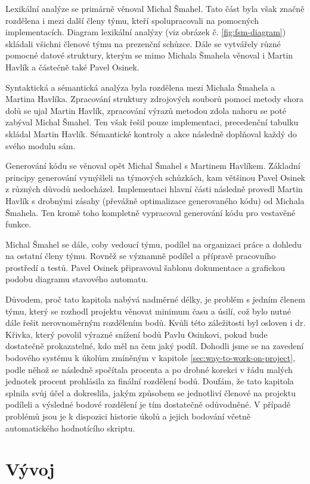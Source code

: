 \documentclass[11pt,a4paper]{article}
\begin{document}
Lexikální analýze se primárně věnoval Michal Šmahel. Tato část byla však značně rozdělena i mezi další členy týmu, kteří spolupracovali na pomocných implementacích. Diagram lexikální analýzy (viz obrázek č. \ref{fig:fsm-diagram}) skládali všichni členové týmu na prezenční schůzce. Dále se vytvářely různé pomocné datové struktury, kterým se mimo Michala Šmahela věnoval i Martin Havlík a částečně také Pavel Osinek.

Syntaktická a sémantická analýza byla rozdělena mezi Michala Šmahela a Martina Havlíka. Zpracování struktury zdrojových souborů pomocí metody shora dolů se ujal Martin Havlík, zpracování výrazů metodou zdola nahoru se poté zabýval Michal Šmahel. Ten však řešil pouze implementaci, precedenční tabulku skládal Martin Havlík. Sémantické kontroly a akce následně doplňoval každý do svého modulu sám.

Generování kódu se věnoval opět Michal Šmahel s Martinem Havlíkem. Základní principy generování vymýšleli na týmových schůzkách, kam většinou Pavel Osinek z různých důvodů nedocházel. Implementaci hlavní části následně provedl Martin Havlík s drobnými zásahy (převážně optimalizace generovaného kódu) od Michala Šmahela. Ten kromě toho kompletně vypracoval generování kódu pro vestavěné funkce.

Michal Šmahel se dále, coby vedoucí týmu, podílel na organizaci práce a dohledu na ostatní členy týmu. Rovněž se významně podílel a přípravě pracovního prostředí a testů. Pavel Osinek připravoval šablonu dokumentace a grafickou podobu diagramu stavového automatu.

Důvodem, proč tato kapitola nabývá nadměrné délky, je problém s jedním členem týmu, který se rozhodl projektu věnovat minimum času a úsilí, což bylo nutné dále řešit nerovnoměrným rozdělením bodů. Kvůli této záležitosti byl osloven i dr. Křivka, který povolil výrazné snížení bodů Pavlu Osinkovi, pokud bude dostatečně prokazatelné, kdo měl na čem jaký podíl. Dohodli jsme se na zavedení bodového systému k úkolům zmíněným v kapitole \ref{sec:way-to-work-on-project}, podle něhož se následně spočítala procenta a po drobné korekci v řádu malých jednotek procent prohlásila za finální rozdělení bodů. Doufám, že tato kapitola splnila svůj účel a dokreslila, jakým způsobem se jednotliví členové na projektu podíleli a výsledné bodové rozdělení je tím dostatečně odůvodněné. V případě problémů jsou je k dispozici historie úkolů a jejich bodování včetně automatického hodnotícího skriptu.

\section{Vývoj}
\end{document}
